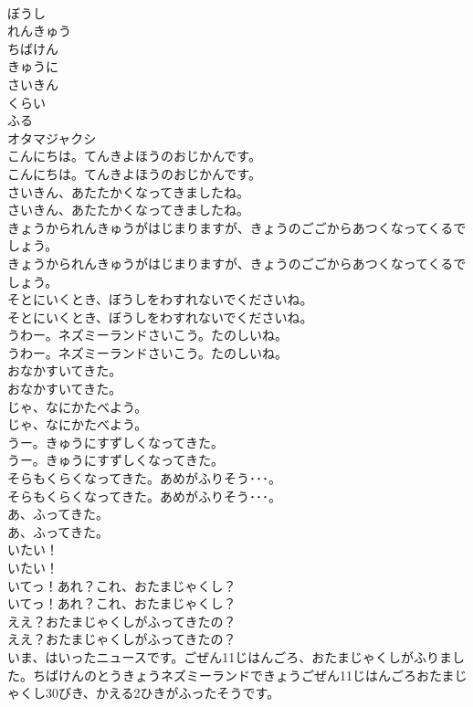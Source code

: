 \documentclass[8pt]{extreport}
\begin{document}
\begin{CJK}{UTF8}{min}
\\	ぼうし
\\	れんきゅう
\\	ちばけん
\\	きゅうに
\\	さいきん
\\	くらい
\\	ふる
\\	オタマジャクシ
\\	こんにちは。てんきよほうのおじかんです。
\\	こんにちは。てんきよほうのおじかんです。
\\	さいきん、あたたかくなってきましたね。
\\	さいきん、あたたかくなってきましたね。
\\	きょうかられんきゅうがはじまりますが、きょうのごごからあつくなってくるでしょう。
\\	きょうかられんきゅうがはじまりますが、きょうのごごからあつくなってくるでしょう。
\\	そとにいくとき、ぼうしをわすれないでくださいね。
\\	そとにいくとき、ぼうしをわすれないでくださいね。
\\	うわー。ネズミーランドさいこう。たのしいね。
\\	うわー。ネズミーランドさいこう。たのしいね。
\\	おなかすいてきた。
\\	おなかすいてきた。
\\	じゃ、なにかたべよう。
\\	じゃ、なにかたべよう。
\\	うー。きゅうにすずしくなってきた。
\\	うー。きゅうにすずしくなってきた。
\\	そらもくらくなってきた。あめがふりそう･･･。
\\	そらもくらくなってきた。あめがふりそう･･･。
\\	あ、ふってきた。
\\	あ、ふってきた。
\\	いたい！
\\	いたい！
\\	いてっ！あれ？これ、おたまじゃくし？
\\	いてっ！あれ？これ、おたまじゃくし？
\\	ええ？おたまじゃくしがふってきたの？
\\	ええ？おたまじゃくしがふってきたの？
\\	いま、はいったニュースです。ごぜん11じはんごろ、おたまじゃくしがふりました。ちばけんのとうきょうネズミーランドできょうごぜん11じはんごろおたまじゃくし30びき、かえる2ひきがふったそうです。

\end{CJK}
\end{document}
